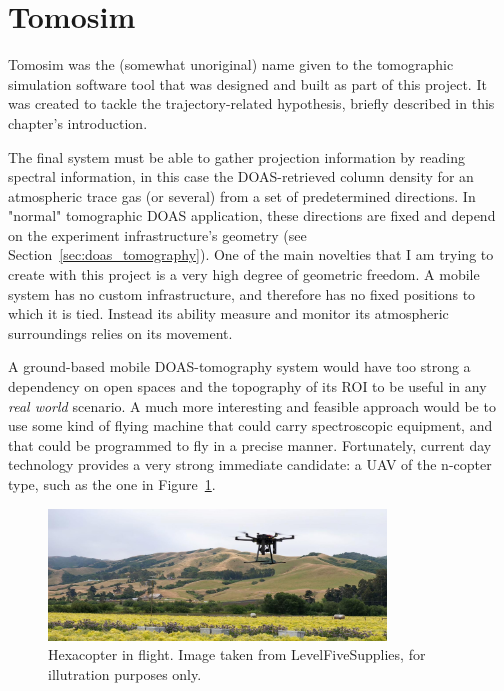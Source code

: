 


\section{Tomosim}%
\label{sec:tomosim}

Tomosim was the (somewhat unoriginal) name given to the tomographic
simulation software tool that was designed and built as part of this
project. It was created to tackle the trajectory-related hypothesis,
briefly described in this chapter's introduction.

The final system must be able to gather projection information by
reading spectral information, in this case the \gls{DOAS}-retrieved
column density for an atmospheric trace gas (or several) from a set of
predetermined directions. In "normal" tomographic \gls{DOAS}
application, these directions are fixed and depend on the experiment
infrastructure's geometry (see Section~\ref{sec:doas_tomography}). One
of the main novelties that I am trying to create with this project is a
very high degree of geometric freedom. A mobile system has no custom
infrastructure, and therefore has no fixed positions to which it is
tied. Instead its ability measure and monitor its atmospheric
surroundings relies on its movement. 

A ground-based mobile \gls{DOAS}-tomography system would have too strong
a dependency on open spaces and the topography of its \gls{ROI} to be
useful in any \textit{real world} scenario. A much more interesting and
feasible approach would be to use some kind of flying machine that could
carry spectroscopic equipment, and that could be programmed to fly in a
precise manner. Fortunately, current day technology provides a very
strong immediate candidate: a \gls{UAV} of the n-copter type, such as
the one in Figure~\ref{fig:an_hexacopter}.

\begin{figure}[htpb]
    \centering
    \includegraphics[width=0.8\textwidth]{img/jpg/hexa_in_flight.jpg}
    \caption{Hexacopter in flight. Image taken from
    LevelFiveSupplies\cite{LevelFiveSupplies2021}, for illutration
    purposes only.}
    \label{fig:an_hexacopter}
\end{figure}

